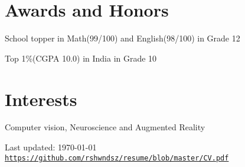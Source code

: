 \documentclass[letterpaper]{article}
\def\footerlink{https://github.com/rshwndsz/resume/blob/master/CV.pdf}
\renewenvironment{itemize}{
  \begin{list}{}{
    \setlength{\leftmargin}{1.5em}
  }
}{
  \end{list}
}
\begin{document}
\section*{Awards and Honors}
\begin{itemize}
  \item School topper in Math(99/100) and English(98/100) in Grade 12
  \item Top 1\%(CGPA 10.0) in India in Grade 10
\end{itemize}


\section*{Interests}
  \begin{itemize}
    \item Computer vision, Neuroscience and Augmented Reality
  \end{itemize}


\bigskip
\begin{center}
  \begin{footnotesize}
    Last updated: \today \\
    \href{\footerlink}{\texttt{\footerlink}}
  \end{footnotesize}
\end{center}
\end{document}
